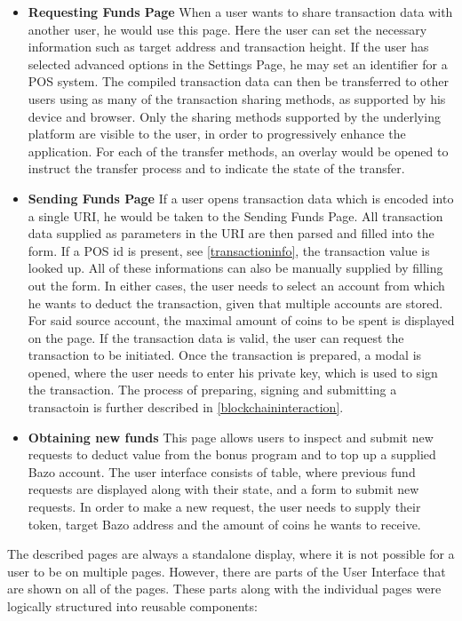 \begin{itemize}
\item \textbf{Requesting Funds Page}
When a user wants to share transaction data with another user, he would use this page. Here the user can set the necessary information such as target address and transaction height. If the user has selected advanced options in the Settings Page, he may set an identifier for a POS system. 
The compiled transaction data can then be transferred to other users using as many of the transaction sharing methods, as supported by his device and browser. Only the sharing methods supported by the underlying platform are visible to the user, in order to progressively enhance the application. For each of the transfer methods, an overlay would be opened to instruct the transfer process and to indicate the state of the transfer.
\item \textbf{Sending Funds Page}
If a user opens transaction data which is encoded into a single URI, he would be taken to the Sending Funds Page.
All transaction data supplied as parameters in the URI are then parsed and filled into the form. If a POS id is present, see \ref{transactioninfo}, the transaction value is looked up. All of these informations can also be manually supplied by filling out the form. In either cases, the user needs to select an account from which he wants to deduct the transaction, given that multiple accounts are stored. For said source account, the maximal amount of coins to be spent is displayed on the page. If the transaction data is valid, the user can request the transaction to be initiated. Once the transaction is prepared, a modal is opened, where the user needs to enter his private key, which is used to sign the transaction. The process of preparing, signing and submitting a transactoin is further described in \ref{blockchaininteraction}.
\item \textbf{Obtaining new funds}
This page allows users to inspect and submit new requests to deduct value from the bonus program and to top up a supplied Bazo account.
The user interface consists of table, where previous fund requests are displayed along with their state, and a form to submit new requests. In order to make a new request, the user needs to supply their token, target Bazo address and the amount of coins he wants to receive. 
\end{itemize}
The described pages are always a standalone display, where it is not possible for a user to be on multiple pages. However, there are parts of the User Interface that are shown on all of the pages. These parts along with the individual pages were logically structured into reusable components:
